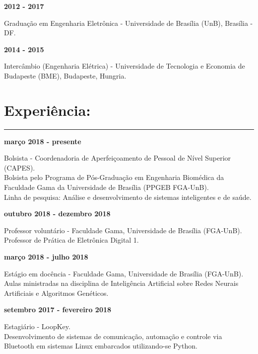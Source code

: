 \documentclass[11pt]{article}
\begin{document}
\textbf{2012 - 2017}
\begin{addmargin}{0.5cm}
Graduação em Engenharia Eletrônica - Universidade de Brasília (UnB), Brasília - DF. \\
\end{addmargin}

\textbf{2014 - 2015} 
\begin{addmargin}{0.5cm}
Intercâmbio (Engenharia Elétrica) - Universidade de Tecnologia e Economia de Budapeste (BME), Budapeste, Hungria. 
\end{addmargin}

\section{Experiência:}
\hrule \vspace{0.1cm}

\textbf{março 2018 - presente}
\begin{addmargin}{0.5cm}
Bolsista - Coordenadoria de Aperfeiçoamento de Pessoal de Nível Superior (CAPES). \\
Bolsista pelo Programa de Pós-Graduação em Engenharia Biomédica
da Faculdade Gama da Universidade de Brasília (PPGEB FGA-UnB).\\
Linha de pesquisa: Análise e desenvolvimento de sistemas inteligentes e de saúde.\\
\end{addmargin}

\textbf{outubro 2018 - dezembro 2018}
\begin{addmargin}{0.5cm}
Professor voluntário - Faculdade Gama, Universidade de Brasília (FGA-UnB).\\
Professor de Prática de Eletrônica Digital 1. \\
\end{addmargin}

\textbf{março 2018 - julho 2018}
\begin{addmargin}{0.5cm}
Estágio em docência - Faculdade Gama, Universidade de Brasília (FGA-UnB).\\
Aulas ministradas na disciplina de Inteligência Artificial sobre Redes 
Neurais Artificiais e Algoritmos Genéticos. \\
\end{addmargin}

\textbf{setembro 2017 - fevereiro 2018}
\begin{addmargin}{0.5cm}
Estagiário - LoopKey.\\
Desenvolvimento de sistemas de comunicação, automação e controle via Bluetooth
em sistemas Linux  embarcados utilizando-se Python. \\
\end{addmargin}
\end{document}
